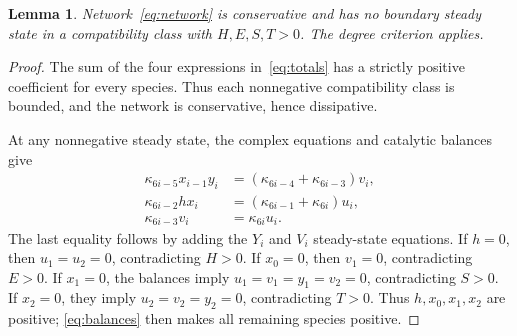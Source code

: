 \documentclass[11pt,a4paper]{article}
\numberwithin{equation}{section}
\newtheorem{lemma}[theorem]{Lemma}
\theoremstyle{remark}\newtheorem{remark}[theorem]{Remark}
\begin{document}
\begin{lemma}\label{lem:boundary}
Network~\eqref{eq:network} is conservative and has no boundary steady state in a compatibility class with $H,E,S,T>0$. The degree criterion applies.
\end{lemma}
\begin{proof}
The sum of the four expressions in~\eqref{eq:totals} has a strictly positive coefficient for every species. Thus each nonnegative compatibility class is bounded, and the network is conservative, hence dissipative.

At any nonnegative steady state, the complex equations and catalytic balances give
\begin{equation}\label{eq:balances}
\begin{aligned}
\kappa_{6i-5}x_{i-1}y_i&=(\kappa_{6i-4}+\kappa_{6i-3})v_i,\\
\kappa_{6i-2}hx_i&=(\kappa_{6i-1}+\kappa_{6i})u_i,\\
\kappa_{6i-3}v_i&=\kappa_{6i}u_i.
\end{aligned}
\end{equation}
The last equality follows by adding the $Y_i$ and $V_i$ steady-state equations. If $h=0$, then $u_1=u_2=0$, contradicting $H>0$. If $x_0=0$, then $v_1=0$, contradicting $E>0$. If $x_1=0$, the balances imply $u_1=v_1=y_1=v_2=0$, contradicting $S>0$. If $x_2=0$, they imply $u_2=v_2=y_2=0$, contradicting $T>0$. Thus $h,x_0,x_1,x_2$ are positive; \eqref{eq:balances} then makes all remaining species positive.
\end{proof}
\end{document}
